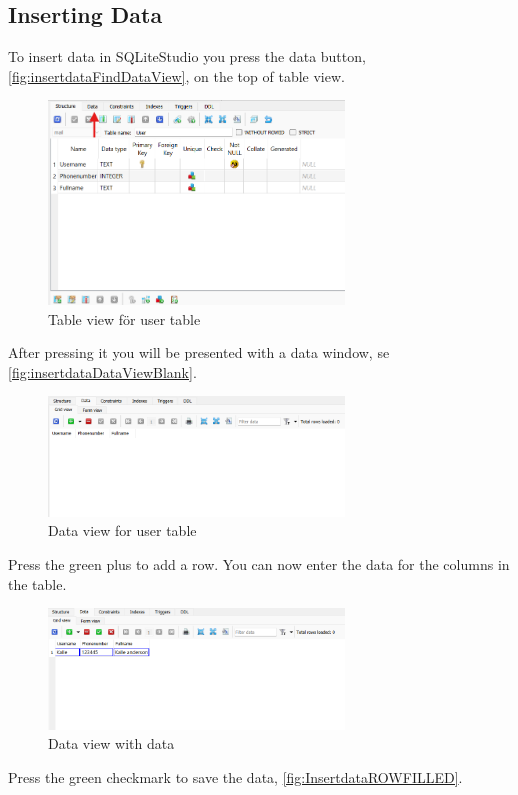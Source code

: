 \documentclass[a4paper,11pt,oneside]{article}
\begin{document}
\begin{sloppypar}
\subsection{Inserting Data}
\label{sqliteStudioInsertingData}
To insert data in SQLiteStudio you press the data button,\autoref{fig:insertdataFindDataView}, on the top of table view. 
\begin{figure}[!htb]
  \centering
  \includegraphics[width=0.7\textwidth]{sqlitestudio/insert_data/insert_data_find_view.png}
  \caption{Table view för user table}
  \label{fig:insertdataFindDataView}
\end{figure}
After pressing it you will be presented with a data window, se \autoref{fig:insertdataDataViewBlank}.
\begin{figure}[!htb]
  \centering
  \includegraphics[width=0.7\textwidth]{sqlitestudio/insert_data/insert_data_view_blank.png}
  \caption{Data view for user table}
  \label{fig:insertdataDataViewBlank}
\end{figure}
Press the green plus to add a row. You can now enter the data for the columns in the table.
\begin{figure}[!htb]
  \centering
  \includegraphics[width=0.7\textwidth]{sqlitestudio/insert_data/insert_data_row_populated.png}
  \caption{Data view with data}
  \label{fig:InsertdataROWFILLED}
\end{figure}
Press the green checkmark to save the data, \autoref{fig:InsertdataROWFILLED}. 
  

\end{sloppypar}
\end{document}

